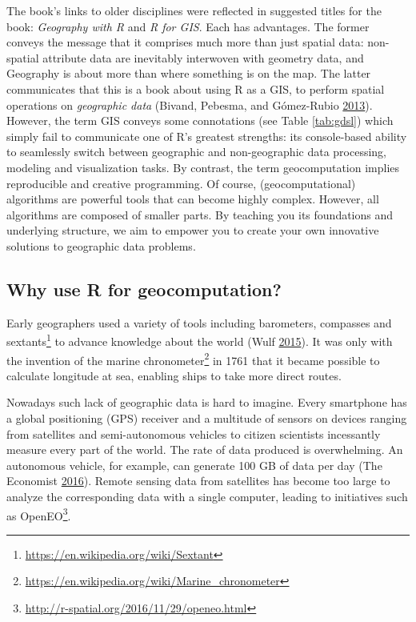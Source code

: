 \documentclass[]{krantz}
\let\rmarkdownfootnote\footnote%
\def\footnote{\protect\rmarkdownfootnote}
\renewcommand{\href}[2]{#2\footnote{\url{#1}}}
\begin{document}
The book's links to older disciplines were reflected in suggested titles for the book: \emph{Geography with R} and \emph{R for GIS}.
Each has advantages.
The former conveys the message that it comprises much more than just spatial data:
non-spatial attribute data are inevitably interwoven with geometry data, and Geography is about more than where something is on the map.
The latter communicates that this is a book about using R as a GIS, to perform spatial operations on \emph{geographic data} (Bivand, Pebesma, and Gómez-Rubio \protect\hyperlink{ref-bivand_applied_2013}{2013}).
However, the term GIS conveys some connotations (see Table \ref{tab:gdsl}) which simply fail to communicate one of R's greatest strengths:
its console-based ability to seamlessly switch between geographic and non-geographic data processing, modeling and visualization tasks.
By contrast, the term geocomputation implies reproducible and creative programming.
Of course, (geocomputational) algorithms are powerful tools that can become highly complex.
However, all algorithms are composed of smaller parts.
By teaching you its foundations and underlying structure, we aim to empower you to create your own innovative solutions to geographic data problems.

\hypertarget{why-use-r-for-geocomputation}{%
\subsection{Why use R for geocomputation?}\label{why-use-r-for-geocomputation}}

Early geographers used a variety of tools including barometers, compasses and \href{https://en.wikipedia.org/wiki/Sextant}{sextants} to advance knowledge about the world (Wulf \protect\hyperlink{ref-wulf_invention_2015}{2015}).
It was only with the invention of the marine \href{https://en.wikipedia.org/wiki/Marine_chronometer}{chronometer} in 1761 that it became possible to calculate longitude at sea, enabling ships to take more direct routes.

Nowadays such lack of geographic data is hard to imagine.
Every smartphone has a global positioning (GPS) receiver and a multitude of sensors on devices ranging from satellites and semi-autonomous vehicles to citizen scientists incessantly measure every part of the world.
The rate of data produced is overwhelming.
An autonomous vehicle, for example, can generate 100 GB of data per day (The Economist \protect\hyperlink{ref-theeconomist_autonomous_2016}{2016}).
Remote sensing data from satellites has become too large to analyze the corresponding data with a single computer, leading to initiatives such as \href{http://r-spatial.org/2016/11/29/openeo.html}{OpenEO}.
\end{document}
